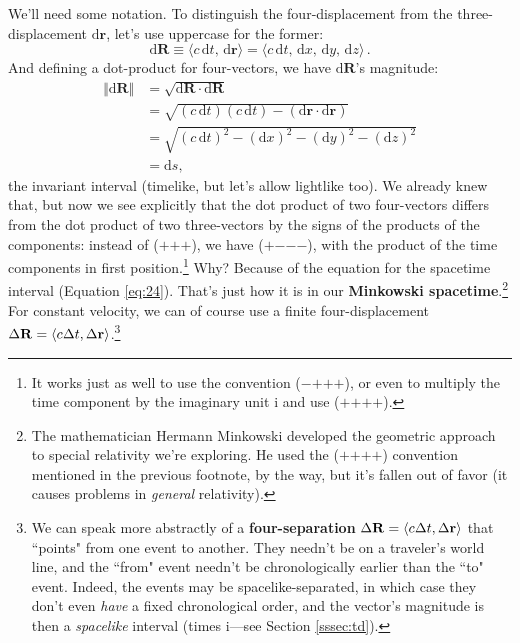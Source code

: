 \documentclass[12pt]{article}
\renewcommand{\vv}[1]{\mathbf{#1}}
\newcommand{\dd}[1]{\mathrm{d}#1}
\begin{document}
We'll need some notation. To distinguish the four-displacement from the three-displacement $\dd \vv r$, let's use uppercase for the former:
\begin{equation}\label{eq:30}
\boxed{\dd \vv R \equiv \langle c \, \dd t, \, \dd \vv r \rangle = \langle c\, \dd t, \, \dd x, \, \dd y, \, \dd z \rangle} \, .
\end{equation}
And defining a dot-product for four-vectors, we have $\dd \vv R$'s magnitude:
\begin{equation*}
\begin{split}
\Vert \dd \vv R \Vert &= \sqrt{\dd \vv R \cdot \dd \vv R}\\
&= \sqrt{(c \, \dd t)(c \, \dd t) - (\dd \vv r \cdot \dd \vv r)}\\
&= \sqrt{(c \, \dd t)^2 - (\dd x)^2 - (\dd y)^2 - (\dd z)^2}\\
&= \dd s,
\end{split}
\end{equation*}
the invariant interval (timelike, but let's allow lightlike too). We already knew that, but now we see explicitly that the dot product of two four-vectors differs from the dot product of two three-vectors by the signs of the products of the components: instead of ($+$$+$$+$), we have ($+$$-$$-$$-$), with the product of the time components in first position.\footnote{\label{fn:sc}It works just as well to use the convention ($-$$+$$+$$+$), or even to multiply the time component by the imaginary unit $\mathrm{i}$ and use ($+$$+$$+$$+$).} Why? Because of the equation for the spacetime interval (Equation \ref{eq:24}). That's just how it is in our \textbf{Minkowski spacetime}.\footnote{The mathematician Hermann Minkowski developed the geometric approach to special relativity we're exploring. He used the ($+$$+$$+$$+$) convention mentioned in the previous footnote, by the way, but it's fallen out of favor (it causes problems in \emph{general} relativity).} For constant velocity, we can of course use a finite four-displacement $\Delta \vv R = \langle c \mkern.5mu \Delta t, \Delta \vv r \rangle$.\footnote{\label{fn:sp}We can speak more abstractly of a \textbf{four-separation} $\Delta \vv R = \langle c \mkern.5mu \Delta t, \Delta \vv r \rangle$ that ``points" from one event to another. They needn't be on a traveler's world line, and the ``from" event needn't be chronologically earlier than the ``to" event. Indeed, the events may be spacelike-separated, in which case they don't even \emph{have} a fixed chronological order, and the vector's magnitude is then a \emph{spacelike} interval (times $\mathrm{i}$---see Section \ref{sssec:td}).}
\end{document}
